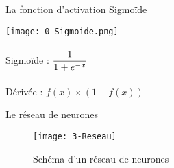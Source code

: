 \begin{frame}{La fonction d'activation Sigmoïde}
    \begin{center}
        \centering
		\texttt{[image: 0-Sigmoide.png]} \\~\\
        Sigmoïde : $\mathlarger{\frac{1}{1+e^{-x}}}$ \\~\\
        Dérivée : $f(x) \times (1-f(x))$
    \end{center}   
\end{frame}

\begin{frame}{Le réseau de neurones}
    \begin{figure}
        \centering
        \texttt{[image: 3-Reseau]}
        \caption[]{Schéma d'un réseau de neurones}
    \end{figure}
\end{frame}